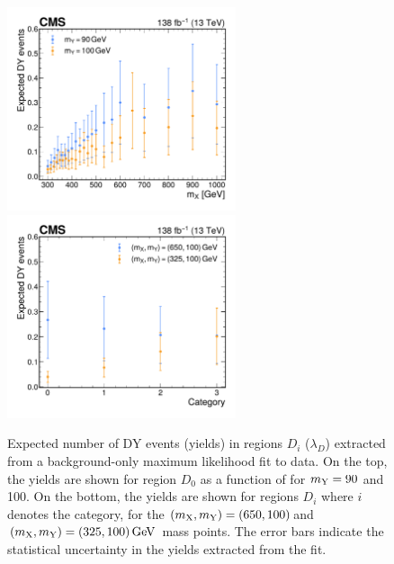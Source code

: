 \begin{figure}
  \centering
  \includegraphics[width=0.6\textwidth]{Figures/Dihiggs/background/dy/dy_yield_vs_mx.pdf}
  \includegraphics[width=0.6\textwidth]{Figures/Dihiggs/background/dy/dy_yield_vs_category.pdf}
  \caption[Expected DY Events Extracted Using ABCD Method]{Expected number of DY events (yields) in regions $D_i$ ($\lambda_D$) extracted from a background-only maximum likelihood fit to data. On the top, the yields are shown for region $D_0$ as a function of \mX for $m_{\mathrm{Y}} = 90$ and 100\GeV. On the bottom, the yields are shown for regions $D_i$ where $i$ denotes the category, for the $(m_{\mathrm{X}}, m_{\mathrm{Y}})=(650,100)$\GeV and $(m_{\mathrm{X}}, m_{\mathrm{Y}}) = (325,100)\,\text{Ge\hspace{-.08em}V}$ mass points. The error bars indicate the statistical uncertainty in the yields extracted from the fit.}\label{fig:dy_expected_events}
\end{figure}